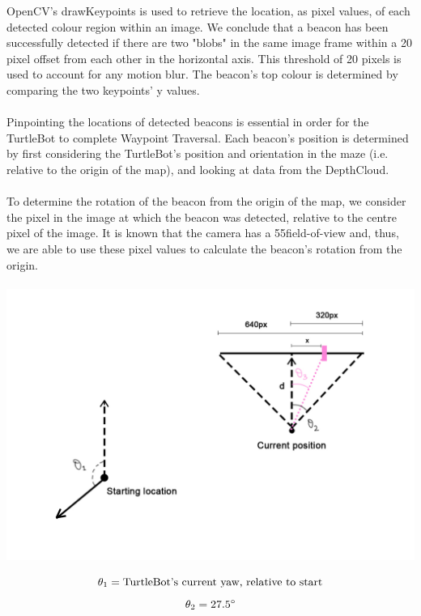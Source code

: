 \documentclass[titlepage,12pt,a4paper]{article}
\begin{document}
\noindent
OpenCV's drawKeypoints is used to retrieve the location, as pixel values, of each detected colour region within an image. We conclude that a beacon has been successfully detected if there are two "blobs" in the same image frame within a 20 pixel offset from each other in the horizontal axis. This threshold of 20 pixels is used to account for any motion blur. The beacon's top colour is determined by comparing the two keypoints' y values.\\
\\
Pinpointing the locations of detected beacons is essential in order for the TurtleBot to complete Waypoint Traversal. Each beacon's position is determined by first considering the TurtleBot's position and orientation in the maze (i.e. relative to the origin of the map), and looking at data from the DepthCloud. \\
\\
To determine the rotation of the beacon from the origin of the map, we consider the pixel in the image at which the beacon was detected, relative to the centre pixel of the image. It is known that the camera has a 55\degree field-of-view and, thus, we are able to use these pixel values to calculate the beacon's rotation from the origin. \\
\\
\includegraphics[scale=0.3]{beacon.jpg}

\begin{equation*}
	\theta_1   =  \mbox{TurtleBot's current yaw, relative to start} \\
\end{equation*}
\begin{equation*}
	\theta_2   =  27.5\degree \\
\end{equation*}
\end{document}
